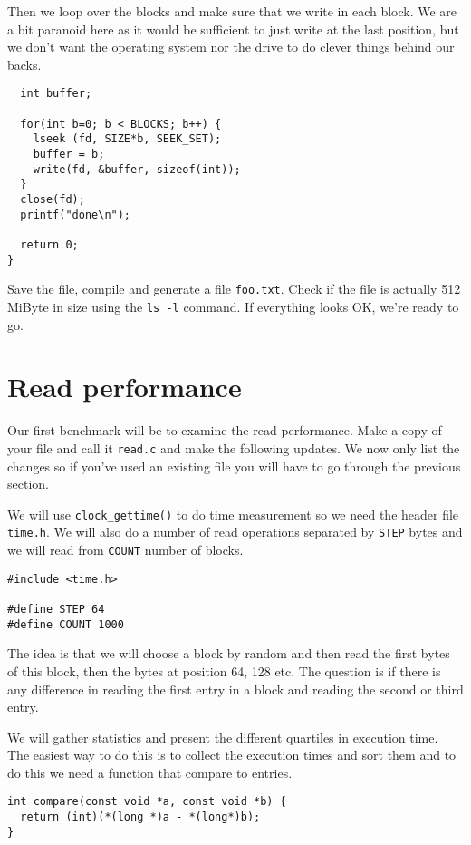 \documentclass[a4paper,11pt]{article}
\begin{document}
Then we loop over the blocks and make sure that we write in each
block.  We are a bit paranoid here as it would be sufficient to just
write at the last position, but we don't want the operating system nor the
drive to do clever things behind our backs.

\begin{lstlisting}
  int buffer;

  for(int b=0; b < BLOCKS; b++) {
    lseek (fd, SIZE*b, SEEK_SET);  
    buffer = b;
    write(fd, &buffer, sizeof(int));    
  }
  close(fd);  
  printf("done\n");

  return 0;
}
\end{lstlisting}

Save the file, compile and generate a file {\tt foo.txt}. Check if the
file is actually 512 MiByte in size using the {\tt ls -l} command. If
everything looks OK, we're ready to go.


\section{Read performance}

Our first benchmark will be to examine the read performance. Make a
copy of your file and call it {\tt read.c} and make the following
updates. We now only list the changes so if you've used an existing
file you will have to go through the previous section.

We will use {\tt clock\_gettime()} to do time measurement so we need the
header file {\tt time.h}. We will also do a number of read operations
separated by {\tt STEP} bytes and we will read from {\tt COUNT}
number of blocks.

\begin{lstlisting}
#include <time.h>

#define STEP 64
#define COUNT 1000
\end{lstlisting}

The idea is that we will choose a block by random and then read the
first bytes of this block, then the bytes at position 64, 128 etc. The
question is if there is any difference in reading the first entry in a
block and reading the second or third entry.

We will gather statistics and present the different quartiles in
execution time. The easiest way to do this is to collect the execution
times and sort them and to do this we need a function that compare to
entries.

\begin{lstlisting}
int compare(const void *a, const void *b) {
  return (int)(*(long *)a - *(long*)b);
}
\end{lstlisting}
\end{document}

